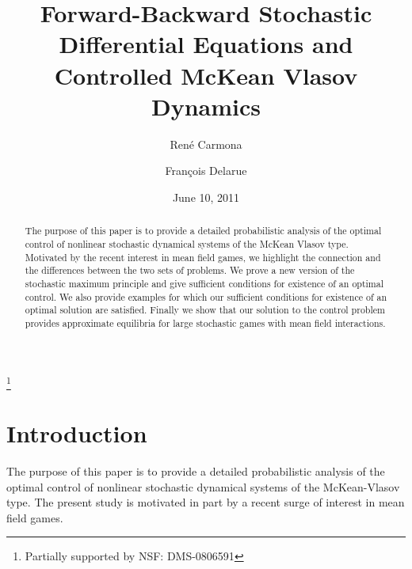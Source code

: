 \documentclass[11pt]{amsart}
\begin{document}
\title[FBSDEs and McKean Vlasov]{Forward-Backward Stochastic Differential Equations and Controlled McKean Vlasov Dynamics}

\author{Ren\'e Carmona}
\address{ORFE, Bendheim Center for Finance, Princeton University,
Princeton, NJ  08544, USA.}
\thanks{Partially supported  by NSF: DMS-0806591}

\author{Fran\c{c}ois Delarue}
\address{Laboratoire Jean-Alexandre Dieudonn\'e, 
Universit\'e de Nice Sophia-Antipolis, 
Parc Valrose, 
06108 Cedex 02, Nice, FRANCE}


\keywords{}

\date{June 10, 2011}

\begin{abstract}
The purpose of this paper is to provide a detailed probabilistic analysis of the optimal control of nonlinear stochastic dynamical systems
of the McKean Vlasov type. Motivated by the recent interest in mean field games, we highlight the connection and the differences 
between the two sets of problems. We prove a new version of the stochastic maximum principle and give sufficient conditions for existence of an optimal
control. We also provide examples for which our sufficient conditions for existence of an optimal solution are satisfied. Finally we show that our solution to the control problem provides approximate equilibria for large stochastic games with mean field interactions.
\end{abstract}

\maketitle

\section{\textbf{Introduction}}
\label{se:intro}

The purpose of this paper is to provide a detailed probabilistic analysis of the optimal control of nonlinear stochastic dynamical systems
of the McKean-Vlasov type. The present study is motivated in part by a recent surge of interest in mean field games.
\end{document}
